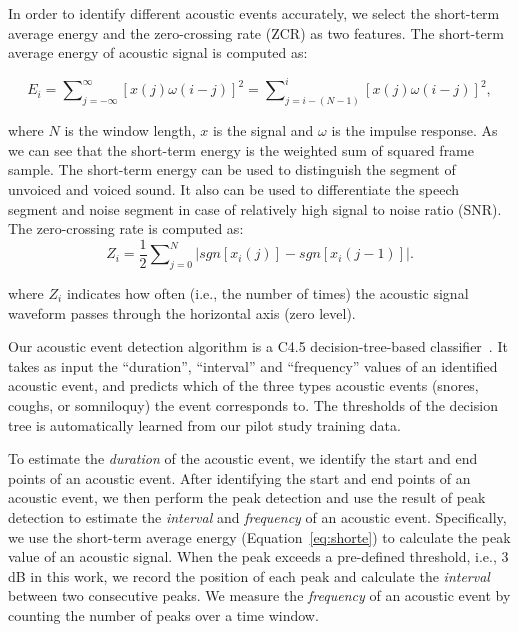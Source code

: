  In order to identify different acoustic events accurately, we select the short-term average
energy and the zero-crossing rate (ZCR) as two features. The short-term average energy of acoustic signal is computed as:

\begin{equation}
  E_i=\sum\nolimits_{j=-\infty}^{\infty}[x(j)\omega(i-j)]^2=\sum\nolimits_{j=i-(N-1)}^{i}[x(j)\omega(i-j)]^2,
  \label{eq:shorte}
\end{equation}

where $N$ is the window length, $x$ is the signal and $\omega$ is the impulse response. As we can see that the short-term energy is the
weighted sum of squared frame sample. The short-term energy can be used to distinguish the segment of unvoiced and voiced sound. It also
can be used to differentiate the speech segment and noise segment  in  case of relatively high signal to noise ratio (SNR). The
zero-crossing rate is computed as:
\begin{equation}
  Z_i = \frac{1}{2}\sum\nolimits_{j=0}^{N}|sgn[x_i(j)]-sgn[x_i(j-1)]|.
  \label{eq:zeroc}
\end{equation}


where $Z_i$ indicates how often (i.e., the number of times) the acoustic signal waveform passes through the horizontal axis (zero level).



 Our acoustic event detection algorithm is a C4.5 decision-tree-based
classifier~\cite{quinlan2014c4}. It takes as input the ``duration'', ``interval'' and ``frequency'' values of an identified acoustic event,
and predicts which of the three types acoustic events (snores, coughs, or somniloquy) the event corresponds to. The thresholds of the
decision tree is automatically learned from our pilot study training data.

To estimate the \emph{duration} of the acoustic event, we identify the start and end points of an acoustic event. After identifying the
start and end points of an acoustic event, we then perform the peak detection and use the result of peak detection to estimate the
\emph{interval} and \emph{frequency} of an acoustic event. Specifically, we use the short-term average energy (Equation~\ref{eq:shorte}) to
calculate the peak value of an acoustic signal. When the peak exceeds a pre-defined threshold, i.e., 3 dB in this work, we record the
position of each peak and calculate the \emph{interval} between two consecutive peaks. We measure the \emph{frequency} of an acoustic event
by counting the number of peaks over a time window.

